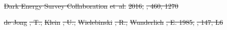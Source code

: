 \documentclass[numberedappendix]{emulateapj}
\providecommand{\DIFdel}[1]{{\protect\color{red}\sout{#1}}}                      %
\begin{document}
\DIFdel{Dark Energy Survey Collaboration}%
\DIFdel{et~al.}%
\DIFdel{2016, }%
\DIFdel{, 460, 1270
}%

\DIFdel{de Jong}%
\DIFdel{, T., }%
\DIFdel{Klein}%
\DIFdel{, U., }%
\DIFdel{Wielebinski}%
\DIFdel{, R., }%
\DIFdel{Wunderlich}%
\DIFdel{, E. 1985, }%
\DIFdel{,
  147, L6
}%
\end{document}
